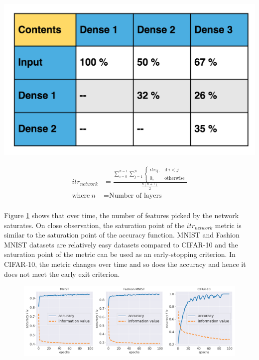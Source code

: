 \documentclass{article}
\begin{document}
\noindent\begin{minipage}{.45\textwidth}
   \centering
   \includegraphics[scale=0.13]{paper/SampleTable.png}
   \label{fig:sample_info_transfer}
\end{minipage}
\begin{minipage}{.45\textwidth}
\begin{equation}
\label{eq:itr_mean}
\begin{aligned}
itr_{network} &= \frac{\sum_{i=0}^{n-1}\sum_{j=1}^{n} 
\begin{cases}
  itr_{ij}, & \text{if}\ i<j \\
  0, & \text{otherwise}
\end{cases}}{\frac{n(n+1)}{2}}\\
\text{where}~n &= \text{Number of layers} \\
\end{aligned}
\end{equation}
\end{minipage}


Figure \ref{fig:iv.png} shows that over time, the number of features picked by the network saturates. On close observation, the saturation point of the $itr_{network}$ metric is similar to the saturation point of the accuracy function. MNIST and Fashion MNIST datasets are relatively easy datasets compared to CIFAR-10 and the saturation point of the metric can be used as an early-stopping criterion. In CIFAR-10, the metric changes over time and so does the accuracy and hence it does not meet the early exit criterion.

\begin{figure}[H]
\centering
\includegraphics[scale=0.3]{paper/iv.png}
\label{fig:iv.png}
\end{figure}
\end{document}
